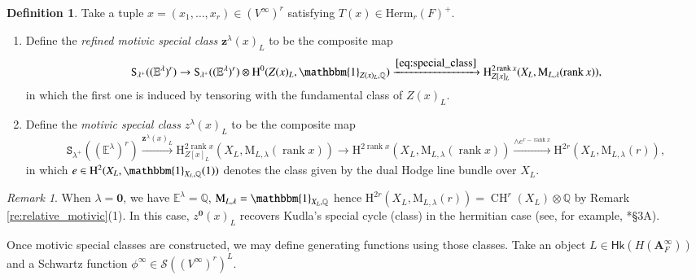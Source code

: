 \documentclass[12pt]{amsart}
\numberwithin{equation}{section}
\theoremstyle{plain}
\theoremstyle{definition}
\newtheorem{definition}[proposition]{Definition}
\theoremstyle{remark}
\newtheorem{remark}[proposition]{Remark}
\renewcommand{\b}[1]{\mathbf{#1}}
\renewcommand{\d}[1]{\mathbb{#1}}
\renewcommand{\r}[1]{\mathrm{#1}}
\newcommand{\s}[1]{\mathscr{#1}}
\renewcommand{\sf}[1]{\mathsf{#1}}
\renewcommand{\(}{\left(}
\renewcommand{\)}{\right)}
\newcommand{\bA}{\b A}
\newcommand{\dE}{\d E}
\newcommand{\dQ}{\d Q}
\newcommand{\rH}{\r H}
\newcommand{\rM}{\r M}
\newcommand{\sS}{\s S}
\newcommand{\tS}{\mathtt{S}}
\newcommand{\bbz}{\boldsymbol{z}}
\newcommand{\Herm}{\r{Herm}}
\newcommand{\Hk}{\sf{Hk}}
\DeclareMathOperator{\CH}{CH}
\DeclareMathOperator{\rank}{rank}
\begin{document}
\begin{definition}\label{de:special_class}
Take a tuple $x=(x_1,\dots,x_r)\in(V^\infty)^r$ satisfying $T(x)\in\Herm_r(F)^+$.
\begin{enumerate}
  \item Define the \emph{refined motivic special class} $\bbz^\lambda(x)_L$ to be the composite map
      \[
      \tS_{\lambda^+}((\dE^\lambda)^r)\to\tS_{\lambda^+}((\dE^\lambda)^r)\otimes\rH^0(Z(x)_L,\mathbbm{1}_{Z(x)_L,\dQ})
      \xrightarrow{\eqref{eq:special_class}}\rH^{2\rank x}_{Z[x]_L}(X_L,\rM_{L,\lambda}(\rank x)),
      \]
      in which the first one is induced by tensoring with the fundamental class of $Z(x)_L$.

  \item Define the \emph{motivic special class} $z^\lambda(x)_L$ to be the composite map
      \[
      \tS_{\lambda^+}((\dE^\lambda)^r)\xrightarrow{\bbz^\lambda(x)_L}\rH^{2\rank x}_{Z[x]_L}(X_L,\rM_{L,\lambda}(\rank x))
      \to\rH^{2\rank x}(X_L,\rM_{L,\lambda}(\rank x))\xrightarrow{\wedge e^{r-\rank x}}
      \rH^{2r}(X_L,\rM_{L,\lambda}(r)),
      \]
      in which $e\in\rH^2(X_L,\mathbbm{1}_{X_L,\dQ}(1))$ denotes the class given by the dual Hodge line bundle over $X_L$.
\end{enumerate}


\end{definition}



\begin{remark}
When $\lambda=\b{0}$, we have $\dE^\lambda=\dQ$, $\rM_{L,\lambda}=\mathbbm{1}_{X_L,\dQ}$ hence $\rH^{2r}(X_L,\rM_{L,\lambda}(r))=\CH^r(X_L)\otimes\dQ$ by Remark \ref{re:relative_motivic}(1). In this case, $z^{\b{0}}(x)_L$ recovers Kudla's special cycle (class) in the hermitian case (see, for example, \cite{Liu11}*{\S3A}).
\end{remark}



Once motivic special classes are constructed, we may define generating functions using those classes. Take an object $L\in\Hk(H(\bA_F^\infty))$ and a Schwartz function $\phi^\infty\in\sS((V^\infty)^r)^L$.
\end{document}
